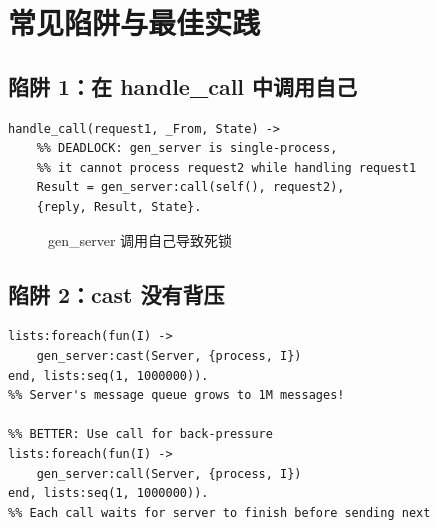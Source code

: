\documentclass[a4paper,11pt]{article}
\begin{document}
\section{常见陷阱与最佳实践}

\subsection{陷阱 1：在 handle\_call 中调用自己}

\begin{lstlisting}[style=erlangstyle, caption={死锁！}]
handle_call(request1, _From, State) ->
    %% DEADLOCK: gen_server is single-process,
    %% it cannot process request2 while handling request1
    Result = gen_server:call(self(), request2),
    {reply, Result, State}.
\end{lstlisting}

\begin{figure}[H]
\centering
{}
\caption{gen\_server 调用自己导致死锁}
\end{figure}

\subsection{陷阱 2：cast 没有背压}

\begin{lstlisting}[style=erlangstyle, caption={cast 导致消息队列爆炸}]
%% BAD: Flooding server with casts
lists:foreach(fun(I) ->
    gen_server:cast(Server, {process, I})
end, lists:seq(1, 1000000)).
%% Server's message queue grows to 1M messages!

%% BETTER: Use call for back-pressure
lists:foreach(fun(I) ->
    gen_server:call(Server, {process, I})
end, lists:seq(1, 1000000)).
%% Each call waits for server to finish before sending next
\end{lstlisting}
\end{document}
